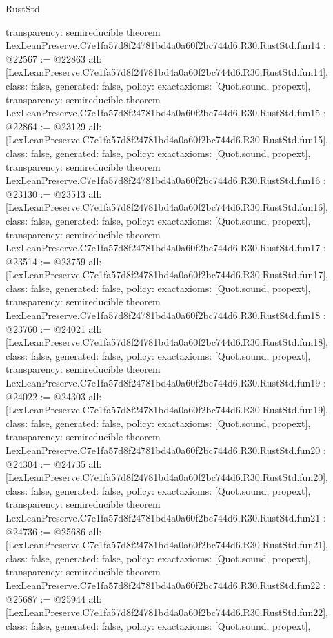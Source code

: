 \begin{lexlean}{RustStd}
\begin{coremodule}
{  transparency: semireducible
}
theorem LexLeanPreserve.C7e1fa57d8f24781bd4a0a60f2bc744d6.R30.RustStd.fun14 : @22567 := @22863 {
  all: [LexLeanPreserve.C7e1fa57d8f24781bd4a0a60f2bc744d6.R30.RustStd.fun14],
  class: false,
  generated: false,
  policy: exact{axioms: [Quot.sound, propext]},
  transparency: semireducible
}
theorem LexLeanPreserve.C7e1fa57d8f24781bd4a0a60f2bc744d6.R30.RustStd.fun15 : @22864 := @23129 {
  all: [LexLeanPreserve.C7e1fa57d8f24781bd4a0a60f2bc744d6.R30.RustStd.fun15],
  class: false,
  generated: false,
  policy: exact{axioms: [Quot.sound, propext]},
  transparency: semireducible
}
theorem LexLeanPreserve.C7e1fa57d8f24781bd4a0a60f2bc744d6.R30.RustStd.fun16 : @23130 := @23513 {
  all: [LexLeanPreserve.C7e1fa57d8f24781bd4a0a60f2bc744d6.R30.RustStd.fun16],
  class: false,
  generated: false,
  policy: exact{axioms: [Quot.sound, propext]},
  transparency: semireducible
}
theorem LexLeanPreserve.C7e1fa57d8f24781bd4a0a60f2bc744d6.R30.RustStd.fun17 : @23514 := @23759 {
  all: [LexLeanPreserve.C7e1fa57d8f24781bd4a0a60f2bc744d6.R30.RustStd.fun17],
  class: false,
  generated: false,
  policy: exact{axioms: [Quot.sound, propext]},
  transparency: semireducible
}
theorem LexLeanPreserve.C7e1fa57d8f24781bd4a0a60f2bc744d6.R30.RustStd.fun18 : @23760 := @24021 {
  all: [LexLeanPreserve.C7e1fa57d8f24781bd4a0a60f2bc744d6.R30.RustStd.fun18],
  class: false,
  generated: false,
  policy: exact{axioms: [Quot.sound, propext]},
  transparency: semireducible
}
theorem LexLeanPreserve.C7e1fa57d8f24781bd4a0a60f2bc744d6.R30.RustStd.fun19 : @24022 := @24303 {
  all: [LexLeanPreserve.C7e1fa57d8f24781bd4a0a60f2bc744d6.R30.RustStd.fun19],
  class: false,
  generated: false,
  policy: exact{axioms: [Quot.sound, propext]},
  transparency: semireducible
}
theorem LexLeanPreserve.C7e1fa57d8f24781bd4a0a60f2bc744d6.R30.RustStd.fun20 : @24304 := @24735 {
  all: [LexLeanPreserve.C7e1fa57d8f24781bd4a0a60f2bc744d6.R30.RustStd.fun20],
  class: false,
  generated: false,
  policy: exact{axioms: [Quot.sound, propext]},
  transparency: semireducible
}
theorem LexLeanPreserve.C7e1fa57d8f24781bd4a0a60f2bc744d6.R30.RustStd.fun21 : @24736 := @25686 {
  all: [LexLeanPreserve.C7e1fa57d8f24781bd4a0a60f2bc744d6.R30.RustStd.fun21],
  class: false,
  generated: false,
  policy: exact{axioms: [Quot.sound, propext]},
  transparency: semireducible
}
theorem LexLeanPreserve.C7e1fa57d8f24781bd4a0a60f2bc744d6.R30.RustStd.fun22 : @25687 := @25944 {
  all: [LexLeanPreserve.C7e1fa57d8f24781bd4a0a60f2bc744d6.R30.RustStd.fun22],
  class: false,
  generated: false,
  policy: exact{axioms: [Quot.sound, propext]},
}
\end{coremodule}
\end{lexlean}
